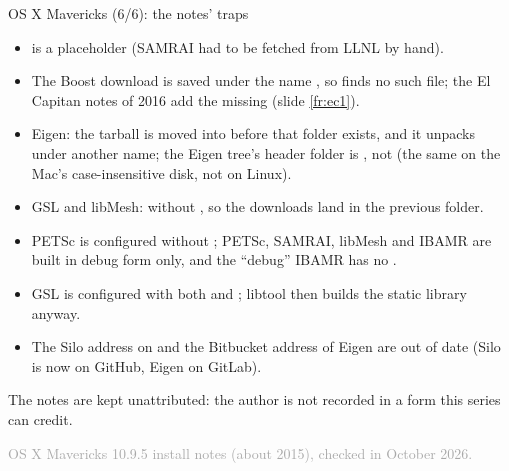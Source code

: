\documentclass[aspectratio=169,11pt]{beamer}
\newcommand{\sourcecredit}[1]{\vfill\begin{flushright}\tiny\textcolor{DarkGray}{#1}\end{flushright}}
\begin{document}
\begin{frame}{OS X Mavericks (6/6): the notes' traps}
\label{fr:mavslips}
\footnotesize
\begin{itemize}\setlength{\itemsep}{3pt}
  \item {} is a placeholder (SAMRAI had to be fetched from LLNL by hand).
  \item The Boost download is saved under the name , so  finds no such file; the El Capitan notes of 2016 add the missing  (slide \ref{fr:ec1}).
  \item Eigen: the tarball is moved into  before that folder exists, and it unpacks under another name; the Eigen tree's header folder is , not  (the same on the Mac's case-insensitive disk, not on Linux).
  \item GSL and libMesh:  without , so the downloads land in the previous folder.
  \item PETSc is configured without ; PETSc, SAMRAI, libMesh and IBAMR are built in debug form only, and the ``debug'' IBAMR has no .
  \item GSL is configured with both  and ; libtool then builds the static library anyway.
  \item The Silo address on  and the Bitbucket address of Eigen are out of date (Silo is now on GitHub, Eigen on GitLab).
\end{itemize}
\vspace{1mm}
\footnotesize The notes are kept unattributed: the author is not recorded in a form this series can credit.
\sourcecredit{OS X Mavericks 10.9.5 install notes (about 2015), checked in October 2026.}
\end{frame}
\end{document}
